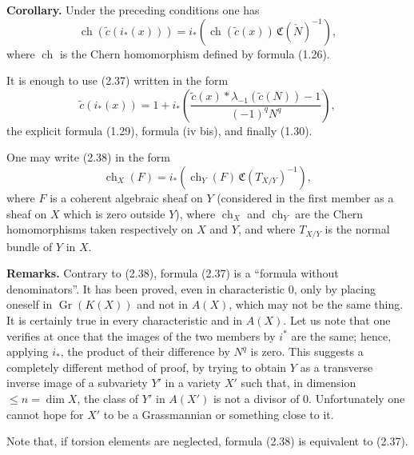 \documentclass[11pt]{article}
\newcommand{\Gr}{\operatorname{Gr}}
\newcommand{\ch}{\operatorname{ch}}
\newcommand{\RRR}{\mathrm{RRR}}
\providecommand{\ch}{\operatorname{ch}}
\providecommand{\Gr}{\operatorname{Gr}}
\providecommand{\Gr}{\operatorname{G}}
\begin{document}
\textbf{Corollary.} Under the preceding conditions one has
\begin{equation}\tag{2.38}
 \ch(\widetilde c(i_*(x)))=i_*\left(\ch(\widetilde c(x))\,\mathfrak C(\check N)^{-1}\right),
\end{equation}
where $\ch$ is the Chern homomorphism defined by formula (1.26).

It is enough to use (2.37) written in the form
\begin{equation}\tag{2.37 bis}
 \widetilde c(i_*(x))=1+i_*\left(\frac{\widetilde c(x)*\lambda_{-1}(\widetilde c(N))-1}{(-1)^qN^q}\right),
\end{equation}
the explicit formula (1.29), formula (iv bis), and finally (1.30).

One may write (2.38) in the form
\begin{equation}\tag{2.38 bis}
 \ch_X(F)=i_*\left(\ch_Y(F)\,\mathfrak C(T_{X/Y})^{-1}\right),
\end{equation}
where $F$ is a coherent algebraic sheaf on $Y$ (considered in the first member as a sheaf on $X$ which is zero outside $Y$), where $\ch_X$ and $\ch_Y$ are the Chern homomorphisms taken respectively on $X$ and $Y$, and where $T_{X/Y}$ is the normal bundle of $Y$ in $X$.

\textbf{Remarks.} Contrary to (2.38), formula (2.37) is a ``formula without denominators''. It has been proved, even in characteristic $0$, only by placing oneself in $\Gr(K(X))$ and not in $A(X)$, which may not be the same thing. It is certainly true in every characteristic and in $A(X)$. Let us note that one verifies at once that the images of the two members by $i^*$ are the same; hence, applying $i_*$, the product of their difference by $N^q$ is zero. This suggests a completely different method of proof, by trying to obtain $Y$ as a transverse inverse image of a subvariety $Y'$ in a variety $X'$ such that, in dimension $\leq n=\dim X$, the class of $Y'$ in $A(X')$ is not a divisor of $0$. Unfortunately one cannot hope for $X'$ to be a Grassmannian or something close to it.

Note that, if torsion elements are neglected, formula (2.38) is equivalent to (2.37).




\providecommand{\cS}{\mathcal S}
\providecommand{\cD}{\mathcal D}
\providecommand{\cE}{\mathscr E}
\providecommand{\cG}{\mathscr G}
\providecommand{\cL}{\mathscr L}
\providecommand{\cM}{\mathscr M}
\providecommand{\cP}{\mathscr P}
\providecommand{\cK}{\mathcal K}
\providecommand{\Db}{\mathrm D}
\providecommand{\Kb}{\mathrm K}
\providecommand{\Trc}{\operatorname{Tr}}
\providecommand{\ob}{\operatorname{ob}}
\providecommand{\Coh}{\operatorname{Coh}}
\providecommand{\Cone}{\operatorname{Cone}}
\providecommand{\im}{\operatorname{Im}}
\providecommand{\Id}{\operatorname{Id}}
\providecommand{\RR}{\mathrm{R.R.}}
\providecommand{\RRR}{\mathrm{R.R.R.}}
\providecommand{\GrR}{\mathrm{G}}
\providecommand{\pr}{\operatorname{pr}}
\end{document}
